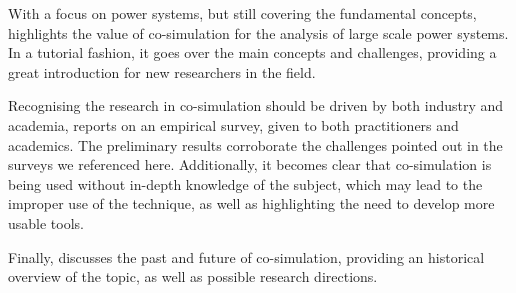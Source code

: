 With a focus on power systems, but still covering the fundamental concepts, \cite{Palensky2017} highlights the value of co-simulation for the analysis of large scale power systems.
In a tutorial fashion, it goes over the main concepts and challenges, providing a great introduction for new researchers in the field.

Recognising the research in co-simulation should be driven by both industry and academia, \cite{Schweiger2018a} reports on an empirical survey, given to both practitioners and academics.
The preliminary results 
corroborate the challenges pointed out in the surveys we referenced here.
Additionally, it becomes clear that co-simulation is being used without in-depth knowledge of the subject, which may lead to the improper use of the technique, as well as highlighting the need to develop more usable tools.

Finally, \cite{Gomes2018b} discusses the past and future of co-simulation, providing an historical overview of the topic, as well as possible research directions.

